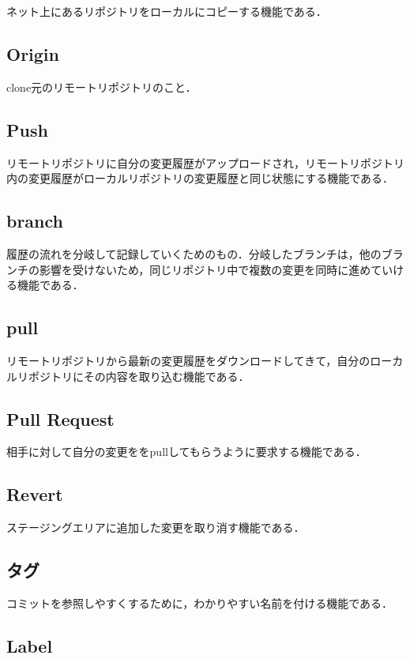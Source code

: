 ネット上にあるリポジトリをローカルにコピーする機能である．


\subsection{Origin}

clone元のリモートリポジトリのこと．


\subsection{Push}

リモートリポジトリに自分の変更履歴がアップロードされ，リモートリポジトリ内の変更履歴がローカルリポジトリの変更履歴と同じ状態にする機能である．


\subsection{branch}

履歴の流れを分岐して記録していくためのもの．分岐したブランチは，他のブランチの影響を受けないため，同じリポジトリ中で複数の変更を同時に進めていける機能である．


\subsection{pull}

リモートリポジトリから最新の変更履歴をダウンロードしてきて，自分のローカルリポジトリにその内容を取り込む機能である．


\subsection{Pull Request}

相手に対して自分の変更ををpullしてもらうように要求する機能である．


\subsection{Revert}

ステージングエリアに追加した変更を取り消す機能である．

\subsection{タグ}

コミットを参照しやすくするために，わかりやすい名前を付ける機能である．

\subsection{Label}


